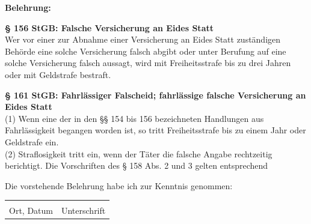 \begin{small}
	\textbf{Belehrung:}

	\textbf{§ 156 StGB: Falsche Versicherung an Eides Statt}\\
	Wer vor einer zur Abnahme einer Versicherung an Eides Statt zuständigen Behörde eine solche Versicherung falsch abgibt oder unter Berufung auf eine solche Versicherung falsch aussagt, wird mit Freiheitsstrafe bis zu drei Jahren oder mit Geldstrafe bestraft.

	\textbf{§ 161 StGB: Fahrlässiger Falscheid; fahrlässige falsche Versicherung an Eides Statt}\\
	(1) Wenn eine der in den §§ 154 bis 156 bezeichneten Handlungen aus Fahrlässigkeit begangen worden ist, so tritt Freiheitsstrafe bis zu einem Jahr oder Geldstrafe ein.\\
	(2) Straflosigkeit tritt ein, wenn der Täter die falsche Angabe rechtzeitig berichtigt. Die Vorschriften des § 158 Abs. 2 und 3 gelten entsprechend
\end{small}

\vspace{0.3cm}

Die vorstehende Belehrung habe ich zur Kenntnis genommen:

\vspace{0.3cm}

\begin{tabular}{@{}p{8cm}p{5.8cm}}
	\underline{\smash{Aachen, den \today}} & \underline{\hspace{5.8cm}}\\
	\vspace{0.02cm}Ort, Datum & \vspace{0.02cm}Unterschrift \\
\end{tabular}

\endgroup
\cleardoublepage


\begingroup
\begin{abstract}
\thispagestyle{plain}
This work investigates the use of the Large Wireless Model as a Foundation Model for massive Multiple-Input Multiple-Output communication systems. We implemented an Autoencoder as an alternative benchmark for downstream tasks. Finally, we evaluated these two representations in Line-of-Sight and Non-Line-of-Sight classification, beam selection, and power allocation across data efficiency, noise robustness, and computational complexity. Our findings demonstrate that the Large Wireless Model exhibits mixed performance with immense latency and parameter overhead. Conversely, the compressed latent vector generated by the Autoencoder provides superior noise robustness and stable performance across all tasks while significantly reducing computational cost and transmission overhead.

\end{abstract}
\endgroup
\cleardoublepage

